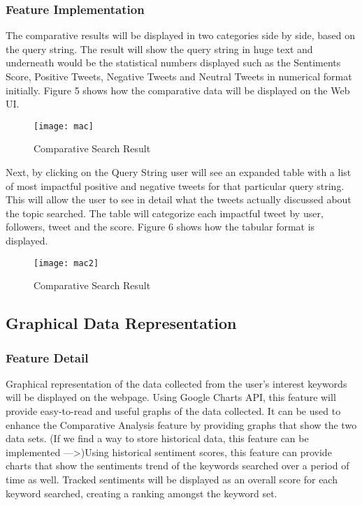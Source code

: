 \documentclass[12pt, titlepage]{article}
\begin{document}
\subsubsection{Feature Implementation}
The comparative results will be displayed in two categories side by side, based on the query string. The result will show the query string in huge text and underneath would be the statistical numbers displayed such as the Sentiments Score, Positive Tweets, Negative Tweets and Neutral Tweets in numerical format initially. Figure 5 shows how the comparative data will be displayed on the Web UI. 
\begin{figure}[H]
\centering
\texttt{[image: mac]}
\caption{Comparative Search Result}
\label{fig:Result}
\end{figure}
Next, by clicking on the Query String user will see an expanded table with a list of most impactful positive and negative tweets for that particular query string. This will allow the user to see in detail what the tweets actually discussed about the topic searched. The table will categorize each impactful tweet by user, followers, tweet and the score. Figure 6 shows how the tabular format is displayed.
\begin{figure}[H]
\centering
\texttt{[image: mac2]}
\caption{Comparative Search Result}
\label{fig:Result}
\end{figure}

\subsection{Graphical Data Representation}
\subsubsection{Feature Detail}
Graphical representation of the data collected from the user’s interest keywords will be displayed on the webpage. Using Google Charts API, this feature will provide easy-to-read and useful graphs of the data collected. It can be used to enhance the Comparative Analysis feature by providing graphs that show the two data sets. (If we find a way to store historical data, this feature can be implemented --->)Using historical sentiment scores, this feature can provide charts that show the sentiments trend of the keywords searched over a period of time as well. Tracked sentiments will be displayed as an overall score for each keyword searched, creating a ranking amongst the keyword set.
\end{document}
